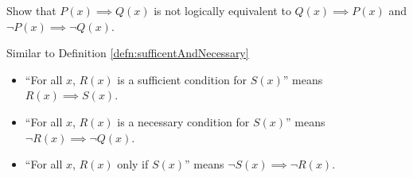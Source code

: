 \begin{exercise}
  Show that $P(x)\implies Q(x)$ is not logically equivalent to $Q(x)\implies P(x)$ and $\neg P(x)\implies \neg Q(x)$.
\end{exercise}

Similar to Definition \ref{defn:sufficentAndNecessary}
\begin{itemize}
  \item ``For all $x$, $R(x)$ is a sufficient condition for $S(x)$'' means $R(x)\implies S(x)$.
  \item ``For all $x$, $R(x)$ is a necessary condition for $S(x)$'' means $\neg R(x)\implies \neg Q(x)$.
  \item ``For all $x$, $R(x)$ only if $S(x)$'' means $\neg S(x)\implies \neg R(x)$.
\end{itemize}
